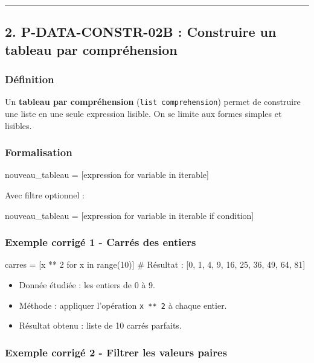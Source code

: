 \begin{center}\rule{0.5\linewidth}{0.5pt}\end{center}

\subsection{2. P-DATA-CONSTR-02B : Construire un tableau par compréhension}

\subsubsection{Définition}

Un \textbf{tableau par compréhension} (\lstinline|list comprehension|) permet de
construire une liste en une seule expression lisible. On se limite aux
formes simples et lisibles.

\subsubsection{Formalisation}

\begin{python}
nouveau_tableau = [expression for variable in iterable]
\end{python}

Avec filtre optionnel :

\begin{python}
nouveau_tableau = [expression for variable in iterable if condition]
\end{python}

\subsubsection{Exemple corrigé 1 - Carrés des entiers}

\begin{python}
carres = [x ** 2 for x in range(10)]
# Résultat : [0, 1, 4, 9, 16, 25, 36, 49, 64, 81]
\end{python}

\begin{itemize}
\tightlist
\item
  Donnée étudiée : les entiers de 0 à 9.
\item
  Méthode : appliquer l'opération \texttt{x\ **\ 2} à chaque entier.
\item
  Résultat obtenu : liste de 10 carrés parfaits.
\end{itemize}

\subsubsection{Exemple corrigé 2 - Filtrer les valeurs paires}

